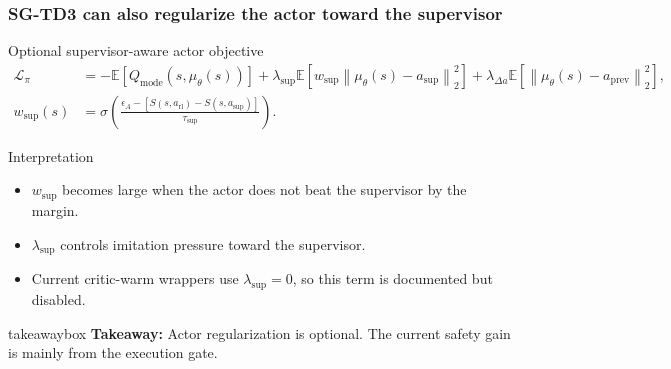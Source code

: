 \documentclass[aspectratio=169]{beamer}
\newcommand{\norm}[1]{\left\lVert #1 \right\rVert}
\newcommand{\takeawaybox}[1]{%
\vspace{0.02cm}
\begin{center}
\begin{beamercolorbox}[wd=0.94\textwidth,sep=3pt,center,rounded=true,shadow=false]{takeawaybox}
\scriptsize
\textbf{\textcolor{maroon1}{Takeaway:}} #1
\end{beamercolorbox}
\end{center}
}
\begin{document}
\begin{frame}
\frametitle{\large \textbf{SG-TD3 can also regularize the actor toward the supervisor}}
\scriptsize

\begin{block}{Optional supervisor-aware actor objective}
\begin{align*}
\mathcal{L}_\pi
&=-\mathbb{E}\left[Q_{\mathrm{mode}}(s,\mu_\theta(s))\right]
+\lambda_{\mathrm{sup}}\mathbb{E}\left[w_{\mathrm{sup}}\norm{\mu_\theta(s)-a_{\mathrm{sup}}}_2^2\right]
+\lambda_{\Delta a}\mathbb{E}\left[\norm{\mu_\theta(s)-a_{\mathrm{prev}}}_2^2\right],\\
w_{\mathrm{sup}}(s)
&=\sigma\left(\frac{\epsilon_A-\left[S(s,a_{\mathrm{rl}})-S(s,a_{\mathrm{sup}})\right]}{\tau_{\mathrm{sup}}}\right).
\end{align*}
\end{block}

\begin{block}{Interpretation}
\begin{itemize}\justifying
  \setlength\itemsep{0.35ex}
  \item \(w_{\mathrm{sup}}\) becomes large when the actor does not beat the supervisor by the margin.
  \item \(\lambda_{\mathrm{sup}}\) controls imitation pressure toward the supervisor.
  \item Current critic-warm wrappers use \(\lambda_{\mathrm{sup}}=0\), so this term is documented but disabled.
\end{itemize}
\end{block}

\takeawaybox{Actor regularization is optional. The current safety gain is mainly from the execution gate.}
\end{frame}
\end{document}

